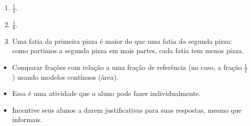 \begin{multicols}{2}
\begin{orientacoes}
\end{orientacoes}

\begin{solucao}{}{}
\begin{enumerate} [\quad a)] %
    \item $\frac{1}{4}$.
    \item $\frac{1}{8}$.
    \item Uma fatia da primeira pizza é maior do que uma fatia da segunda pizza: como partimos a segunda pizza em mais partes, cada fatia tem menos pizza.

\end{enumerate} %
\begin{center}
        \quad \quad
\end{center}
\end{solucao}


  \begin{objetivos}[label=chap2-ativ8]{}{}
  \begin{itemize} %
    \item       Comparar frações com relação a uma fração de referência (no caso, a fração       $\frac{1}{2}$) usando modelos contínuos (área).
\end{itemize} %


\end{objetivos}

\begin{orientacoes}
  \begin{itemize} %
    \item       Essa é uma atividade que o aluno pode fazer individualmente.
    \item       Incentive seus alunos a darem justificativas para suas respostas, mesmo que informais.
\end{itemize} %

\end{orientacoes}


\end{multicols}

